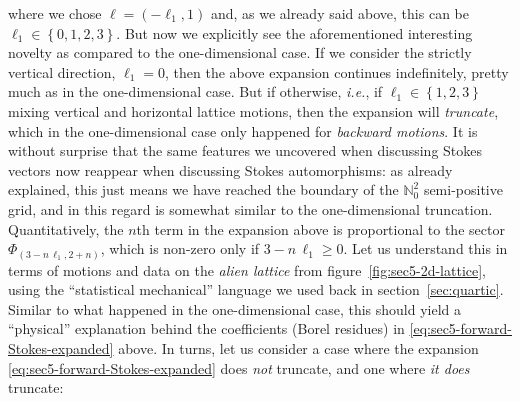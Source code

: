 \documentclass[11pt,a4paper]{article}
\def\BN{{\mathbb N}}
\begin{document}
where we chose $\boldsymbol{\ell} = \left(-\ell_{1},1\right)$ and, as we already said above, this can be $\ell_1 \in \left\{ 0,1,2,3 \right\}$. But now we explicitly see the aforementioned interesting novelty as compared to the one-dimensional case. If we consider the strictly vertical direction, $\ell_{1}=0$, then the above expansion continues indefinitely, pretty much as in the one-dimensional case. But if otherwise, \textit{i.e.}, if $\ell_1 \in \left\{ 1,2,3 \right\}$ mixing vertical and horizontal lattice motions, then the expansion will \textit{truncate}, which in the one-dimensional case only happened for \textit{backward motions}. It is without surprise that the same features we uncovered when discussing Stokes vectors now reappear when discussing Stokes automorphisms: as already explained, this just means we have reached the boundary of the $\BN^2_0$ semi-positive grid, and in this regard is somewhat similar to the one-dimensional truncation. Quantitatively, the $n$th term in the expansion above is proportional to the sector $\Phi_{\left(3-n\,\ell_{1},2+n\right)}$, which is non-zero only if $3-n\,\ell_{1}\ge0$. Let us understand this in terms of motions and data on the \textit{alien lattice} from figure~\ref{fig:sec5-2d-lattice}, using the ``statistical mechanical'' language we used back in section~\ref{sec:quartic}. Similar to what happened in the one-dimensional case, this should yield a ``physical'' explanation behind the coefficients (Borel residues) in \eqref{eq:sec5-forward-Stokes-expanded} above. In turns, let us consider a case where the expansion \eqref{eq:sec5-forward-Stokes-expanded} does \textit{not} truncate, and one where \textit{it does} truncate:
%
\end{document}
